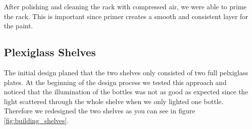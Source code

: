 \documentclass{acm_proc_article-sp}
\begin{document}
After polishing and cleaning the rack with compressed air, we were able to prime the rack. This is important since primer creates a smooth and consistent layer for the paint.


\subsection{Plexiglass Shelves}

\begin{minipage}{\linewidth}%
\label{fig:building_shelves}%
\end{minipage}

The initial design planed that the two shelves only consisted of two full pelxiglass plates. At the beginning of the design process we tested this approach and noticed that the illumination of the bottles was not as good as expected since the light scattered through the whole shelve when we only lighted one bottle. Therefore we redesigned the two shelves as you can see in figure \ref{fig:building_shelves}. 

\begin{minipage}{\linewidth}%
\label{fig:illuminated_shelves}%
\end{minipage}
\end{document}
